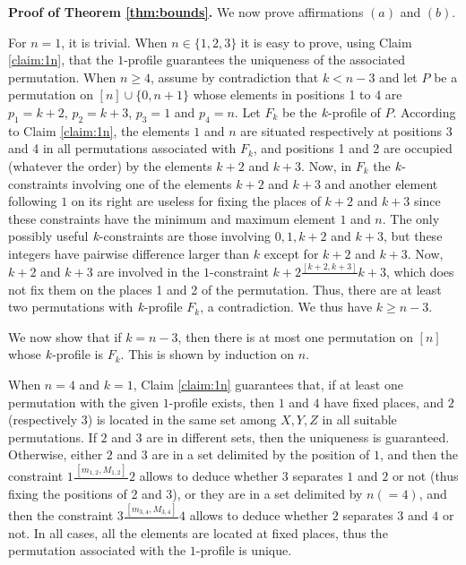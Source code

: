 \documentclass{article}
\newcommand{\kM}{\mbox{\it k}}
\newcommand{\n}{[n]}
\begin{document}
{\bf Proof of Theorem \ref{thm:bounds}.}  We now prove affirmations $(a)$ and $(b)$.

 For $n=1$, it is trivial.
When $n\in\{1, 2, 3\}$ it is easy to prove,  using Claim \ref{claim:1n}, that the $1$-profile guarantees 
the uniqueness of the associated permutation.
When $n\geq 4$, assume by contradiction that  $k<n-3$ and  let $P$ be a permutation on $\n\cup\{0,n+1\}$ 
whose elements in positions 1 to 4 are $p_1=k+2$, $p_2=k+3$, $p_3=1$ and $p_4=n$.
Let $F_k$ be the $\kM$-profile of $P$.
According to Claim  \ref{claim:1n}, the elements $1$ and $n$ are situated respectively at positions
3 and 4 in all permutations associated with $F_k$, and positions 1 and 2 are occupied (whatever the order) 
by the elements $k+2$ and $k+3$. Now, in $F_k$ the 
$\kM$-constraints involving one of the elements $k+2$ and $k+3$  and another
element following $1$ on its right are useless for fixing the places of $k+2$ and $k+3$ 
since these constraints have the minimum and maximum element $1$ and $n$.
The only possibly useful $\kM$-constraints are those involving $0, 1, k+2$ and $k+3$, but these 
integers have pairwise difference larger than $k$ except for $k+2$ and $k+3$. Now,  $k+2$ and $k+3$ are 
involved in the $1$-constraint $k+2\frac{\scriptstyle{[k+2,k+3]}}{}k+3$, which does not fix them on the places 1 and 2 of
the permutation. Thus, there are at least two permutations with $\kM$-profile $F_k$, a contradiction. 
We thus have $k\geq n-3$.
 
We now show that if $k=n-3$, then there is at most one permutation on $\n$ whose $\kM$-profile is 
$F_k$. This is shown by induction on $n$. 

When $n=4$ and $k=1$, Claim \ref{claim:1n} guarantees that, if at least one permutation with the
given $1$-profile exists, then $1$ and $4$ have fixed places, and 
$2$ (respectively $3$) is located in the  same set among  $X, Y, Z$ in all suitable permutations.
If $2$ and $3$ are in different sets, then the uniqueness is guaranteed. Otherwise, either $2$ and $3$ are in a set delimited
by the position of $1$, and then the constraint $1\frac{\,\scriptstyle{[m_{1,2},M_{1,2}]}\,}{}2$ allows
to deduce whether $3$ separates $1$ and $2$ or not (thus fixing the positions of 2 and 3), 
or they are in a set delimited by $n(=4)$, and then the
constraint $3\frac{\,\scriptstyle{[m_{3,4},M_{3,4}]}\,}{}4$ allows to deduce whether $2$ separates $3$ and $4$ or not.
In all cases, all the elements are located at fixed places, thus the permutation associated with the
$1$-profile is unique.
\end{document}

